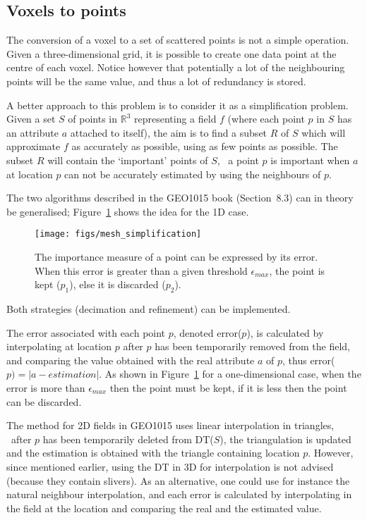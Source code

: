 \subsection{Voxels to points}

The conversion of a voxel to a set of scattered points is not a simple operation.
Given a three-dimensional grid, it is possible to create one data point at the centre of each voxel.
Notice however that potentially a lot of the neighbouring points will be the same value, and thus a lot of redundancy is stored.

%

A better approach to this problem is to consider it as a simplification problem.
Given a set $S$ of points in $\mathbb{R}^3$ representing a field $f$ (where each point $p$ in $S$ has an attribute $a$ attached to itself), the aim is to find a subset $R$ of $S$ which will approximate $f$ as accurately as possible, using as few points as possible. 
The subset $R$ will contain the `important' points of $S$, \ie\ a point $p$ is important when $a$ at location $p$ can not be accurately estimated by using the neighbours of $p$.

%

The two algorithms described in the GEO1015 book (Section~8.3) can in theory be generalised; Figure~\ref{fig:meshsimplification} shows the idea for the 1D case.
\begin{figure}
  \centering
  \texttt{[image: figs/mesh\_simplification]}
  \caption{The importance measure of a point can be expressed by its error. When this error is greater than a given threshold $\epsilon_{max}$, the point is kept ($p_1$), else it is discarded ($p_2$).}%
\label{fig:meshsimplification}
\end{figure}
Both strategies (decimation and refinement) can be implemented.

The error associated with each point $p$, denoted error($p$), is calculated by interpolating at location $p$ after $p$ has been temporarily removed from the field, and comparing the value obtained with the real attribute $a$ of $p$, thus error($p) = |a - estimation|$. 
As shown in Figure~\ref{fig:meshsimplification} for a one-dimensional case, when the error is more than $\epsilon_{max}$ then the point must be kept, if it is less then the point can be discarded.

The method for 2D fields in GEO1015 uses linear interpolation in triangles, \ie\ after $p$ has been temporarily deleted from DT($S$), the triangulation is updated and the estimation is obtained with the triangle containing location $p$. 
However, since mentioned earlier, using the DT in 3D for interpolation is not advised (because they contain slivers).
As an alternative, one could use for instance the natural neighbour interpolation, and each error is calculated by interpolating in the field at the location and comparing the real and the estimated value.


